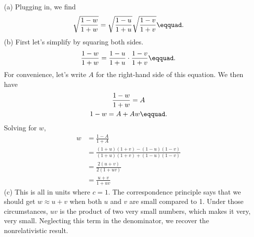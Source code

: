 (a) Plugging in, we find
\begin{equation*}
  \sqrt{\frac{1-w}{1+w}} =   \sqrt{\frac{1-u}{1+u}}   \sqrt{\frac{1-v}{1+v}}\eqquad.
\end{equation*}
(b) First let's simplify by squaring both sides.
\begin{equation*}
  \frac{1-w}{1+w} =   \frac{1-u}{1+u}  \cdot \frac{1-v}{1+v}\eqquad.
\end{equation*}
For convenience, let's write $A$ for the right-hand side of this equation. We then have
\begin{gather*}
  \frac{1-w}{1+w} = A \\
  1-w = A+Aw\eqquad.
\end{gather*}
Solving for $w$,
\begin{align*}
  w &= \frac{1-A}{1+A} \\
    &= \frac{(1+u)(1+v)-(1-u)(1-v)}{(1+u)(1+v)+(1-u)(1-v)} \\
    &= \frac{2(u+v)}{2(1+uv)} \\
    &= \frac{u+v}{1+uv}
\end{align*}
(c) This is all in units where $c=1$. The correspondence principle says that we should get $w\approx u+v$ when
both $u$ and $v$ are small compared to 1. Under those circumstances, $uv$ is the product of two very small
numbers, which makes it very, very small. Neglecting this term in the denominator, we recover the nonrelativistic result.


